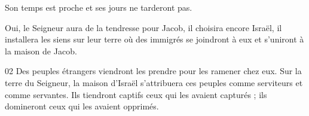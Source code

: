 Son temps est proche et ses jours ne tarderont pas.

Oui, le Seigneur aura de la tendresse pour Jacob, il choisira encore Israël, il installera les siens sur leur terre où des immigrés se joindront à eux et s’uniront à la maison de Jacob.

02 Des peuples étrangers viendront les prendre pour les ramener chez eux. Sur la terre du Seigneur, la maison d’Israël s’attribuera ces peuples comme serviteurs et comme servantes. Ils tiendront captifs ceux qui les avaient capturés ; ils domineront ceux qui les avaient opprimés.
